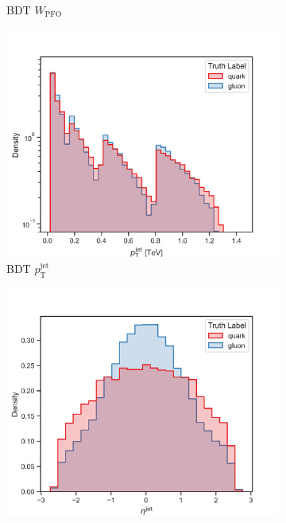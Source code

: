 \begin{figure}[!htb]
\begin{subfigure}[t]{0.45\textwidth}
        \caption{BDT $W_{\mathrm{PFO}}$}
        \label{fig:app_bdt_W_PFO}
    \end{subfigure}
    \begin{subfigure}[t]{0.45\textwidth}
        \includegraphics[width=\linewidth]{src/plots/distributions/BDT/pt_jet.png}
        \caption{BDT $p_{\mathrm{T}}^{\mathrm{jet}}$}
        \label{fig:app_bdt_pt_jet}
    \end{subfigure}
    \begin{subfigure}[t]{0.45\textwidth}
        \includegraphics[width=\linewidth]{src/plots/distributions/BDT/eta_jet.png}

\end{subfigure}
\end{figure}
